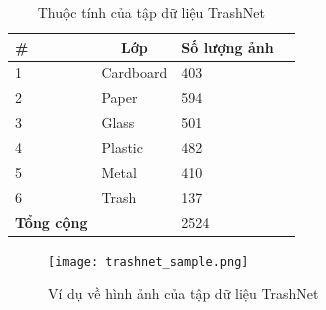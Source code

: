 \documentclass[../the.tex]{subfiles}
\begin{document}
\begin{table}[!ht]
	\centering
	\caption{Thuộc tính của tập dữ liệu TrashNet}
	\begin{tabular}{|p{2cm}|p{4cm}|p{3.5cm}|p{2cm}|}
		\hline
		\multicolumn{1}{|l|}{
			\textbf{\#}}
		 & \multicolumn{1}{c|}{\textbf{Lớp}}
		 & \multicolumn{1}{c|}{\textbf{Số lượng ảnh}} \\
		\hline

		1
		 & Cardboard
		 & 403                                        \\
		\hline

		2
		 & Paper
		 & 594                                        \\
		\hline

		3
		 & Glass
		 & 501                                        \\
		\hline

		4
		 & Plastic
		 & 482                                        \\
		\hline

		5
		 & Metal
		 & 410                                        \\
		\hline

		6
		 & Trash
		 & 137                                        \\
		\hline


		\textbf{Tổng cộng}
		 &
		 & 2524                                       \\
		\hline
	\end{tabular}

	\label{tab:dataset}
\end{table}

\begin{figure}[H]
	\centering
	\texttt{[image: trashnet\_sample.png]}
	\caption{Ví dụ về hình ảnh của tập dữ liệu TrashNet}
	\label{fig:dataset_0}
\end{figure}
\end{document}
